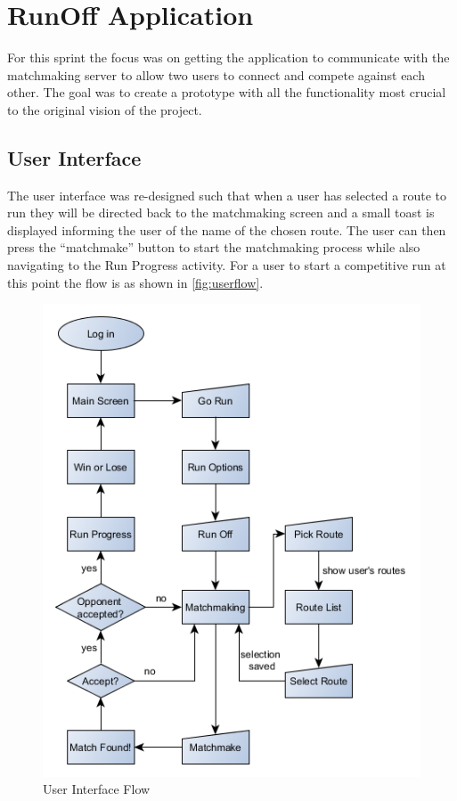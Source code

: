 \section{RunOff Application}
For this sprint the focus was on getting the application to communicate with the matchmaking server to allow two users to connect and compete against each other. The goal was to create a prototype with all the functionality most crucial to the original vision of the project.

\subsection{User Interface} 
The user interface was re-designed such that when a user has selected a route to run they will be directed back to the matchmaking screen and a small toast is displayed informing the user of the name of the chosen route. The user can then press the ``matchmake'' button to start the matchmaking process while also navigating to the Run Progress activity. For a user to start a competitive run at this point the flow is as shown in \autoref{fig:userflow}.

\begin{figure}[!ht]
	\begin{center}
		\includegraphics[scale=0.7]{img/runappflow.png}
		\caption{User Interface Flow}
		\label{fig:userflow}
	\end{center}
\end{figure}

